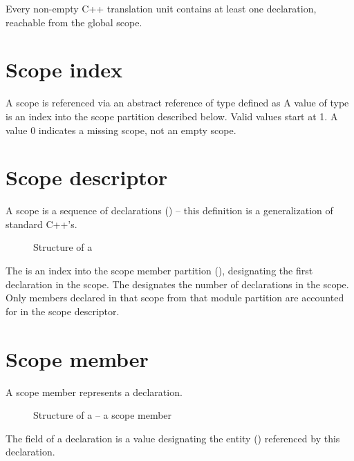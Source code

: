 \label{sec:ifc-scopes}

Every non-empty C++ translation unit contains at least one declaration, reachable from the global scope.

\section{Scope index}
\label{sec:ifc-scope-index}

A scope is referenced via an abstract reference of type  defined as 
%
A value of type  is an index into the scope partition described below.  Valid values start at 1.  A  value 0 
indicates a missing scope, not an empty scope.

\section{Scope descriptor}
\label{sec:ifc-scope-desc}

A scope is a sequence of declarations () -- this definition is a generalization of standard C++'s.
%
\begin{figure}[h]
	\centering
	\caption{Structure of a }
	\label{fig:ifc-scope-structure}
\end{figure}
%
The  is an index into the scope member partition (), designating the first declaration in the scope.
The  designates the number of declarations in the scope.  Only members declared in that scope from that module partition
are accounted for in the scope descriptor.



\section{Scope member}
\label{sec:ifc-scope-member}

A scope member represents a declaration.
%
\begin{figure}[h]
	\centering
	\caption{Structure of a  -- a scope member}
	\label{fig:ifc-declaration-structure}
\end{figure}
%

The  field of a declaration is a  value designating the entity () referenced by this declaration.


